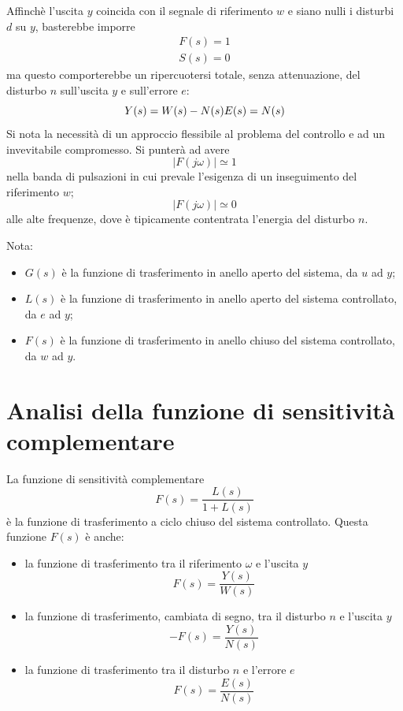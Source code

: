 \documentclass[a4paper]{report}
\begin{document}
Affinch\`e l'uscita $y$ coincida con il segnale di riferimento $w$ e
siano nulli i disturbi $d$ su $y$, basterebbe imporre
\[
\begin{array}{l}
  F(s) = 1\\
  S(s) = 0
\end{array}
\]
ma questo comporterebbe un ripercuotersi totale, senza attenuazione,
del disturbo $n$ sull'uscita $y$ e sull'errore $e$:
\[
Y(s) = W(s) - N(s)\\
E(s) = N(s)
\]
Si nota la necessit\`a di un approccio flessibile al problema del
controllo e ad un invevitabile compromesso. Si punter\`a ad avere
\[
|F(j \omega)| \simeq 1
\]
nella banda di pulsazioni in cui prevale l'esigenza di un inseguimento
del riferimento $w$;
\[
|F(j \omega)| \simeq 0
\]
alle alte frequenze, dove \`e tipicamente contentrata l'energia del
disturbo $n$.

Nota:
\begin{itemize}
\item $G(s)$ \`e la funzione di trasferimento in anello aperto del
  sistema, da $u$ ad $y$;
\item $L(s)$ \`e la funzione di trasferimento in anello aperto del
  sistema controllato, da $e$ ad $y$;
\item $F(s)$ \`e la funzione di trasferimento in anello chiuso del
  sistema controllato, da $w$ ad $y$.
\end{itemize}

\section{Analisi della funzione di sensitivit\`a complementare}
La funzione di sensitivit\`a complementare
\[
F(s) = \dfrac{L(s)}{1 + L(s)}
\]
\`e la funzione di trasferimento a ciclo chiuso del sistema
controllato. Questa funzione $F(s)$ \`e anche:
\begin{itemize}
\item la funzione di trasferimento tra il riferimento $\omega$ e
  l'uscita $y$
  \[
  F(s) = \dfrac{Y(s)}{W(s)}
  \]
\item la funzione di trasferimento, cambiata di segno, tra il disturbo
  $n$ e l'uscita $y$
  \[
  - F(s) = \dfrac{Y(s)}{N(s)}
  \]
\item la funzione di trasferimento tra il disturbo $n$ e l'errore $e$
  \[
  F(s) = \dfrac{E(s)}{N(s)}
  \]
\end{itemize}
\end{document}
